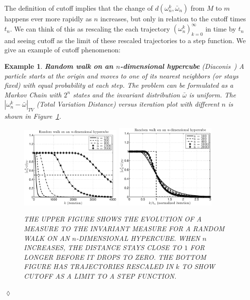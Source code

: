 \documentclass[twocolumn,10pt]{asme2e}
\newtheorem{example_base}{Example}
\newenvironment{example}{\begin{example_base}}
   {\hspace{\stretch{1}}$\lozenge$\end{example_base}}
\begin{document}
The definition of cutoff implies that the change of
$d(\omega_n^k,\bar{\omega}_n)$ from $M$ to $m$ happens ever more
rapidly as $n$ increases, but only in relation to the cutoff times
$t_n$. We can think of this as rescaling the each trajectory
$(\omega_n^k)_{k=0}^{\infty}$ in time by $t_n$ and seeing cutoff as
the limit of these rescaled trajectories to a step function. We give an example of cutoff phenomenon:

\begin{example} \textbf{Random walk on an $n$-dimensional hypercube} (Diaconis~\cite{Diaconis1990})
A particle starts at the origin and moves to one of its nearest
neighbors (or stays fixed) with equal probability at each step. The
problem can be formulated as a Markov Chain with $2^n$ states and the
invariant distribution $\bar{\omega}$ is uniform. The $|\omega^k_n -
\bar{\omega} |_{TV}$ (Total Variation Distance) versus iteration plot
with different $n$ is shown in Figure~\ref{rdwalk}.
\begin{figure}
       \includegraphics[width=0.45\textwidth,trim=1cm 0cm 0cm 0cm]{rdwalk}
       \includegraphics[width=0.45\textwidth,trim=1cm 0cm 0cm 0cm]{rdwalkn} 
       \caption{\label{rdwalk} THE UPPER FIGURE SHOWS THE EVOLUTION OF
         A MEASURE TO THE INVARIANT MEASURE FOR A RANDOM WALK ON AN
         $n$-DIMENSIONAL HYPERCUBE. WHEN $n$ INCREASES, THE DISTANCE
         STAYS CLOSE TO $1$ FOR LONGER BEFORE IT DROPS TO ZERO. THE
         BOTTOM FIGURE HAS TRAJECTORIES RESCALED IN $k$ TO SHOW CUTOFF
         AS A LIMIT TO A STEP FUNCTION.}
\end{figure}
\end{example}
\end{document}
